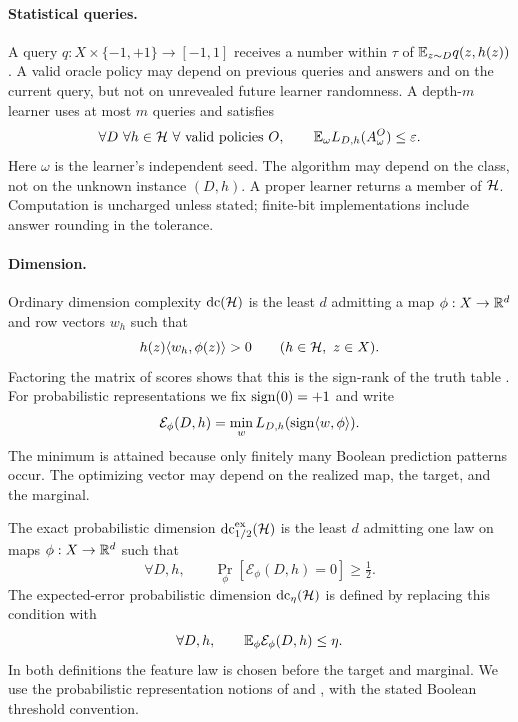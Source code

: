 \paragraph{Statistical queries.}
A query $q:X\times\{-1,+1\}\to[-1,1]$ receives a number within $\tau$ of $\mathbb E_{z\sim D}q(z,h(z))$ \citep{Kearns98}. A valid oracle policy may depend on previous queries and answers and on the current query, but not on unrevealed future learner randomness. A depth-$m$ learner uses at most $m$ queries and satisfies
\begin{equation}
 \forall D\ \forall h\in\mathcal H\ \forall\text{ valid policies }O,
 \qquad \mathbb E_\omega L_{D,h}(A^O_\omega)\le\varepsilon.
 \label{eq:learnmodel}
\end{equation}
Here $\omega$ is the learner's independent seed. The algorithm may depend on the class, not on the unknown instance $(D,h)$. A proper learner returns a member of $\mathcal H$. Computation is uncharged unless stated; finite-bit implementations include answer rounding in the tolerance.

\paragraph{Dimension.}
Ordinary dimension complexity $\operatorname{dc}(\mathcal H)$ is the least $d$ admitting a map $\phi:X\to\mathbb R^d$ and row vectors $w_h$ such that
\begin{equation}
 h(z)\langle w_h,\phi(z)\rangle>0\qquad(h\in\mathcal H,\ z\in X).
 \label{eq:dcdef}
\end{equation}
Factoring the matrix of scores shows that this is the sign-rank of the truth table \citep{BES02}. For probabilistic representations we fix $\operatorname{sign}(0)=+1$ and write
\[
 \mathcal E_\phi(D,h)=\min_w L_{D,h}(\operatorname{sign}\langle w,\phi\rangle).
\]
The minimum is attained because only finitely many Boolean prediction patterns occur. The optimizing vector may depend on the realized map, the target, and the marginal.

The exact probabilistic dimension $\operatorname{dc}^{\mathrm{ex}}_{1/2}(\mathcal H)$ is the least $d$ admitting one law on maps $\phi:X\to\mathbb R^d$ such that
\begin{equation}
 \forall D,h,\qquad \Pr_\phi[\mathcal E_\phi(D,h)=0]\ge\tfrac12.
 \label{eq:exactprob}
\end{equation}
The expected-error probabilistic dimension $\operatorname{dc}_\eta(\mathcal H)$ is defined by replacing this condition with
\begin{equation}
 \forall D,h,\qquad \mathbb E_\phi\mathcal E_\phi(D,h)\le\eta.
 \label{eq:avgprob}
\end{equation}
In both definitions the feature law is chosen before the target and marginal. We use the probabilistic representation notions of \citet{CMW25} and \citet{KMS20}, with the stated Boolean threshold convention.

